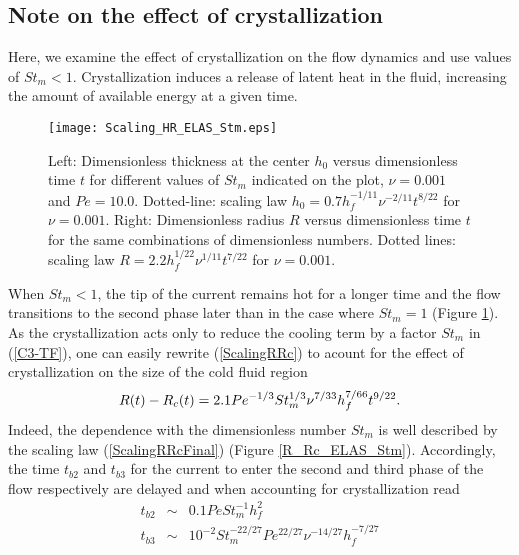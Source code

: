 \subsection{Note on the effect of crystallization}
\label{sec:note-effect-cryst-1}

Here, we  examine the effect  of crystallization on the  flow dynamics
and use  values of $St_m <  1$.  Crystallization induces a  release of
latent heat in the fluid, increasing the amount of available energy at
a given time.
\begin{figure}
  \begin{center}
    \graphicspath{ {/Users/thorey/Documents/These/Projet/Refroidissement/Skin_Model/Figure/JFM_V13/} }
    \texttt{[image: Scaling\_HR\_ELAS\_Stm.eps]}
    \caption{Left: Dimensionless thickness at  the center $h_0$ versus
      dimensionless time $t$ for  different values of $St_m$ indicated
      on the  plot, $\nu=0.001$ and $Pe  =10.0$.  Dotted-line: scaling
      law $h_0= 0.7h_f^{-1/11}\nu^{-2/11}t^{8/22}$  for $\nu = 0.001$.
      Right: Dimensionless  radius $R$  versus dimensionless  time $t$
      for  the same  combinations  of  dimensionless numbers.   Dotted
      lines:  scaling  law $R=  2.2h_f^{1/22}\nu^{1/11}t^{7/22}$  for
      $\nu = 0.001$.}
    \label{Scaling_HR_ELAS_Stm}
  \end{center}
\end{figure}
When $St_m<1$,  the tip of the  current remains hot for  a longer time
and the  flow transitions to the  second phase later than  in the case
where   $St_m=1$    (Figure   \ref{Scaling_HR_ELAS_Stm}).     As   the
crystallization  acts only  to reduce  the  cooling term  by a  factor
$St_m$ in (\ref{C3-TF}), one  can easily rewrite (\ref{ScalingRRc}) to
acount for the effect of crystallization on the size of the cold fluid
region
\begin{equation}
  R(t)-R_c(t) =2.1Pe^{-1/3}St_m^{1/3}\nu^{7/33}
  h_f^{7/66}t^{9/22}.\label{ScalingRRcFinal}\\
\end{equation}
Indeed, the  dependence with the  dimensionless number $St_m$  is well
described   by  the   scaling   law  (\ref{ScalingRRcFinal})   (Figure
\ref{R_Rc_ELAS_Stm}).  Accordingly, the time $t_{b2}$ and $t_{b3}$ for
the  current  to  enter  the  second  and  third  phase  of  the  flow
respectively are delayed and when accounting for crystallization read
\begin{eqnarray}
  t_{b2}&\sim&0.1Pe St_m^{-1} h_f^2\label{tb2}\\
  t_{b3}&\sim&   10^{-2}  St_m^{-22/27}Pe^{22/27}\nu^{-14/27}h_f^{-7/27}\label{tb3}
\end{eqnarray}
